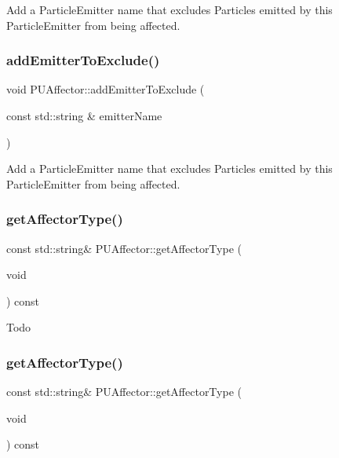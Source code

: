 Add a Particle\+Emitter name that excludes Particles emitted by this Particle\+Emitter from being affected. \mbox{\label{classPUAffector_aaf379b616eb066ce9535a56c1c4bd4cd}} 
\subsubsection{\texorpdfstring{add\+Emitter\+To\+Exclude()}{addEmitterToExclude()}\hspace{0.1cm}{\footnotesize\ttfamily [2/2]}}
{\footnotesize\ttfamily void P\+U\+Affector\+::add\+Emitter\+To\+Exclude (\begin{DoxyParamCaption}\item[{const std\+::string \&}]{emitter\+Name }\end{DoxyParamCaption})}

Add a Particle\+Emitter name that excludes Particles emitted by this Particle\+Emitter from being affected. \mbox{\label{classPUAffector_ad3a61fcbb1b3f0c38363aad914389e0c}} 
\subsubsection{\texorpdfstring{get\+Affector\+Type()}{getAffectorType()}\hspace{0.1cm}{\footnotesize\ttfamily [1/2]}}
{\footnotesize\ttfamily const std\+::string\& P\+U\+Affector\+::get\+Affector\+Type (\begin{DoxyParamCaption}\item[{void}]{ }\end{DoxyParamCaption}) const\hspace{0.3cm}{\ttfamily [inline]}}

Todo \mbox{\label{classPUAffector_ad3a61fcbb1b3f0c38363aad914389e0c}} 
\subsubsection{\texorpdfstring{get\+Affector\+Type()}{getAffectorType()}\hspace{0.1cm}{\footnotesize\ttfamily [2/2]}}
{\footnotesize\ttfamily const std\+::string\& P\+U\+Affector\+::get\+Affector\+Type (\begin{DoxyParamCaption}\item[{void}]{ }\end{DoxyParamCaption}) const\hspace{0.3cm}{\ttfamily [inline]}}

